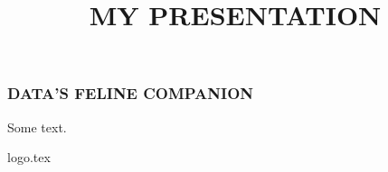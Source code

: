 \documentclass{beamer}
\begin{document}
\title{MY PRESENTATION}

\begin{frame}
  \frametitle{DATA'S FELINE COMPANION}
  Some text.
  \begin{center}
    {logo.tex}
  \end{center}
\end{frame}
\end{document}

